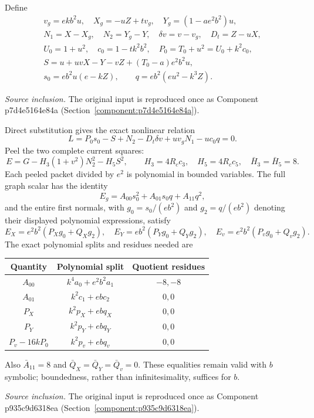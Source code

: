 Define
\begin{gather*}
v_g=ekb^2u,\quad X_g=-uZ+tv_g,\quad Y_g=(1-ae^2b^2)u,\\
N_1=X-X_g,\quad N_2=Y_g-Y,\quad \delta v=v-v_g,\quad D_t=Z-uX,\\
U_0=1+u^2,\quad c_0=1-tk^2b^2,\quad P_0=T_0+u^2=U_0+k^2c_0,\\
S=u+uvX-Y-vZ+(T_0-a)e^2b^2u,\\
s_0=eb^2u(e-kZ),\qquad q=eb^2(eu^2-k^3Z).
\end{gather*}
\par\noindent\textit{Source inclusion. }The original input is reproduced once as Component p7d4e5164e84a (Section~\ref{component:p7d4e5164e84a}).\par
Direct substitution gives the exact nonlinear relation
\[
L=P_0s_0-S+N_2-D_t\delta v+uv_gN_1-uc_0q=0. \tag{E1}
\]
Peel the two complete current squares:
\[
E=G-H_3(1+v^2)N_2^2-H_5S^2,\qquad
H_3=4R_cc_3,\quad H_5=4R_cc_5,\quad \bar H_3=\bar H_5=8.
\]
Each peeled packet divided by $e^2$ is polynomial in bounded variables. The full graph scalar has the identity
\[
E_g=A_{00}s_0^2+A_{01}s_0q+A_{11}q^2,
\]
and the entire first normals, with $g_0=s_0/(eb^2)$ and $g_2=q/(eb^2)$ denoting their displayed polynomial expressions, satisfy
\[
E_X=e^2b^2(P_Xg_0+Q_Xg_2),\quad
E_Y=eb^2(P_Yg_0+Q_Yg_2),\quad
E_v=e^2b^2(P_vg_0+Q_vg_2).
\]
The exact polynomial splits and residues needed are
\begin{center}\small
\begin{tabular}{ccc}\toprule
Quantity&Polynomial split&Quotient residues\\\midrule
$A_{00}$&$k^4a_0+e^2b^2a_1$&$-8,-8$\\
$A_{01}$&$k^2c_1+ebc_2$&$0,0$\\
$P_X$&$k^2p_X+ebq_X$&$0,0$\\
$P_Y$&$k^2p_Y+ebq_Y$&$0,0$\\
$P_v-16kP_0$&$k^2p_v+ebq_v$&$0,0$\\\bottomrule
\end{tabular}
\end{center}
Also $\bar A_{11}=8$ and $\bar Q_X=\bar Q_Y=\bar Q_v=0$. These equalities remain valid with $b$ symbolic; boundedness, rather than infinitesimality, suffices for $b$.

\par\noindent\textit{Source inclusion. }The original input is reproduced once as Component p935c9d6318ea (Section~\ref{component:p935c9d6318ea}).\par

